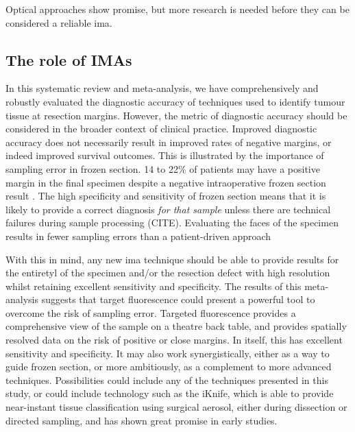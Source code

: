 Optical approaches show promise, but more research is needed before they can be considered a reliable \gls{ima}.

\subsection{The role of IMAs}
In this systematic review and meta-analysis, we have comprehensively and robustly evaluated the diagnostic accuracy of techniques used to identify tumour tissue at resection margins.
However, the metric of diagnostic accuracy should be considered in the broader context of clinical practice.
Improved diagnostic accuracy does not necessarily result in improved rates of negative margins, or indeed improved survival outcomes.
This is illustrated by the importance of sampling error in frozen section. 
14 to 22\% of patients may have a positive margin in the final specimen despite a negative intraoperative frozen section result \cite{ordAccuracyFrozenSections1997, due.RefiningUtilityRole2016}.
The high specificity and sensitivity of frozen section means that it is likely to provide a correct diagnosis \textit{for that sample} unless there are technical failures during sample processing (CITE).
Evaluating the faces of the specimen results in fewer sampling errors than a patient-driven approach \cite{aaboubouty.SpecimendrivenIntraoperativeAssessment2020, amitImprovingRateNegative2016, due.RefiningUtilityRole2016, maxwellEarlyOralTongue2015, bergeronm.DecreasingLocoregionalRecurrence2016}

With this in mind, any new \gls{ima} technique should be able to provide results for the entiretyl of the specimen and/or the resection defect with high resolution whilst retaining excellent sensitivity and specificity.
The results of this meta-analysis suggests that target fluorescence could present a powerful tool to overcome the risk of sampling error.
Targeted fluorescence provides a comprehensive view of the sample on a theatre back table, and provides spatially resolved data on the risk of positive or close margins.
In itself, this has excellent sensitivity and specificity. 
It may also work synergistically, either as a way to guide frozen section, or more ambitiously, as a complement to more advanced techniques.
Possibilities could include any of the techniques presented in this study, or could include technology such as the iKnife, which is able to provide near-instant tissue classification using surgical aerosol, either during dissection or directed sampling, and has shown great promise in early studies.


